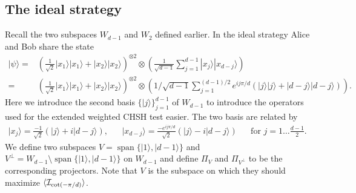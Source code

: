 \documentclass[11pt,letterpaper]{article}
\newcommand{\ket}[1]{|#1\rangle}
\newcommand{\bra}[1]{\langle#1|}
\newcommand{\ketbra}[2]{|#1\rangle\langle#2|}
\newcommand{\x}{\otimes}
\DeclarePairedDelimiter{\ip}{\langle}{\rangle}
\DeclareMathOperator{\spn}{span}
\newcommand{\1}{\mathbb{1}}
\newcommand{\I}{\mathcal{I}}
\theoremstyle{definition}
\begin{document}
\subsection{The ideal strategy}
Recall the two subspaces $W_{d-1}$ and $W_2$ defined earlier. 
In the ideal strategy Alice and Bob share the state 
\begin{align}
\ket{\psi} = &(\frac{1}{\sqrt{2}} \ket{x_1}\ket{x_1} + \ket{x_2}\ket{x_2})^{\x 2} \x \left(\frac{1}{\sqrt{d-1}} \sum_{j=1}^{d-1} \ket{x_j}\ket{x_{d-j}}\right)\\
=&(\frac{1}{\sqrt{2}} \ket{x_1}\ket{x_1} + \ket{x_2}\ket{x_2})^{\x 2} \x \left(1/\sqrt{d-1} \sum_{j=1}^{(d-1)/2} e^{ij\pi/d}(\ket{j}\ket{j} + \ket{d-j}\ket{d-j})\right).
\end{align}
Here we introduce the second basis $\{ \ket{j} \}_{j=1}^{d-1}$ of $W_{d-1}$ to introduce the 
operators used for the extended weighted CHSH test easier. The two basis are related by
\begin{align}
	\ket{x_j} = \frac{-1}{\sqrt{2}}(\ket{j} + i\ket{d-j}), &&
	\ket{x_{d-j}} = \frac{-e^{ij\pi/d}}{\sqrt{2}}(\ket{j} - i\ket{d-j}) && \text{for } j = 1 \dots \frac{d-1}{2}.
\end{align}
We define two subspaces $V = \spn\{\ket{1}, \ket{d-1}\}$ and $V^\perp = W_{d-1} \setminus\spn\{\ket{1}, \ket{d-1}\}$ on
$W_{d-1}$ and
define $\Pi_V$ and $\Pi_{V^\perp}$ to be the corresponding projectors. Note that $V$ is the subspace on which they should maximize $\ip{\I_{\cot(-\pi/d)}}$.
\end{document}
